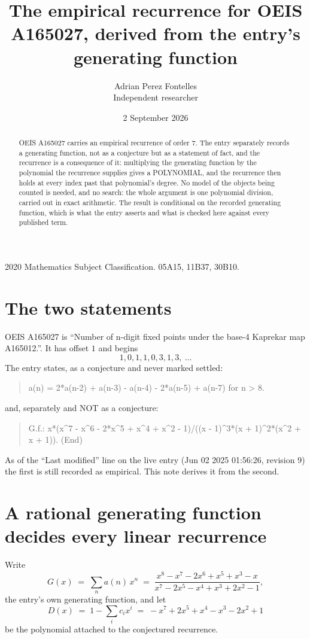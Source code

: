 \documentclass[11pt,a4paper]{article}
\title{The empirical recurrence for OEIS A165027, derived from the entry's generating function}
\author{Adrian Perez Fontelles\\ \small Independent researcher}
\date{2 September 2026}
\theoremstyle{plain}
\theoremstyle{definition}
\begin{document}
\maketitle

\begin{abstract}
OEIS A165027 carries an empirical recurrence of order $7$. The entry separately records a
generating function, not as a conjecture but as a statement of fact, and the recurrence is a
consequence of it: multiplying the generating function by the polynomial the recurrence
supplies gives a POLYNOMIAL, and the recurrence then holds at every index past that
polynomial's degree. No model of the objects being counted is needed, and no search: the
whole argument is one polynomial division, carried out in exact arithmetic. The result is
conditional on the recorded generating function, which is what the entry asserts and what is
checked here against every published term.
\end{abstract}

\noindent\small 2020 Mathematics Subject Classification. 05A15, 11B37, 30B10.\normalsize

\section{The two statements}

OEIS A165027 is ``Number of n-digit fixed points under the base-4 Kaprekar map A165012.''. It has offset $1$ and begins
\[
1, 0, 1, 1, 0, 3, 1, 3,\ \dots
\]
The entry states, as a conjecture and never marked settled:
\begin{quote}
a(n) = 2*a(n-2) + a(n-3) - a(n-4) - 2*a(n-5) + a(n-7) for n > 8.
\end{quote}
and, separately and NOT as a conjecture:
\begin{quote}
G.f.: x*(x\^{}7 - x\^{}6 - 2*x\^{}5 + x\^{}4 + x\^{}2 - 1)/((x - 1)\^{}3*(x + 1)\^{}2*(x\^{}2 + x + 1)). (End)
\end{quote}
As of the ``Last modified'' line on the live entry (Jun 02 2025 01:56:26, revision 9) the first is still
recorded as empirical. This note derives it from the second.

\section{A rational generating function decides every linear recurrence}

Write
\[
G(x)\;=\;\sum_{n}a(n)\,x^{n}\;=\;\frac{x^{8} - x^{7} - 2 x^{6} + x^{5} + x^{3} - x}{x^{7} - 2 x^{5} - x^{4} + x^{3} + 2 x^{2} - 1},
\]
the entry's own generating function, and let
\[
D(x)\;=\;1-\sum_i c_i x^{i}\;=\;- x^{7} + 2 x^{5} + x^{4} - x^{3} - 2 x^{2} + 1
\]
be the polynomial attached to the conjectured recurrence.
\end{document}
